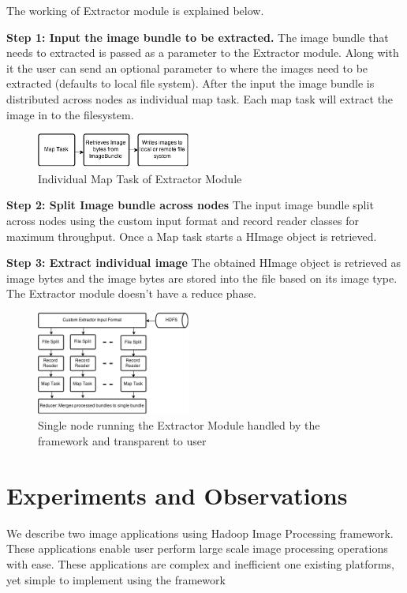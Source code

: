 \documentclass[conference]{IEEEtran}
\begin{document}
The working of Extractor module is explained below.

\textbf{Step 1: Input the image bundle to be extracted.} The image bundle that needs to extracted is passed as a parameter to the Extractor module. Along with it the user can send an optional parameter to where the images need to be extracted (defaults to local file system). After the input the image bundle is distributed across nodes as individual map task. Each map task will extract the image in to the filesystem.     

\begin{figure}[h]
	\centering
	\includegraphics[width=0.45\textwidth]{ext-map}
	\caption{Individual Map Task of Extractor Module}
	\label{fig:ext-map}
\end{figure}


\textbf{Step 2: Split Image bundle across nodes}
The input image bundle split across nodes using the custom input format and record reader classes for maximum throughput. Once a Map task starts a HImage object is retrieved.

\textbf{Step 3: Extract individual image}
The obtained HImage object is retrieved as image bytes and the image bytes are stored into the file based on its image type. The Extractor module doesn't have a reduce phase.

\begin{figure}[h]
	\centering
	\includegraphics[width=0.45\textwidth]{ext-node}
	\caption{Single node running the Extractor Module handled by the framework and transparent to user}
	\label{fig:ext-node}
\end{figure}


\section{Experiments and Observations}

We describe two image applications using Hadoop Image Processing framework. These applications enable user perform large scale image processing operations with ease. These applications are complex and inefficient one existing platforms, yet simple to implement using the framework
\end{document}
